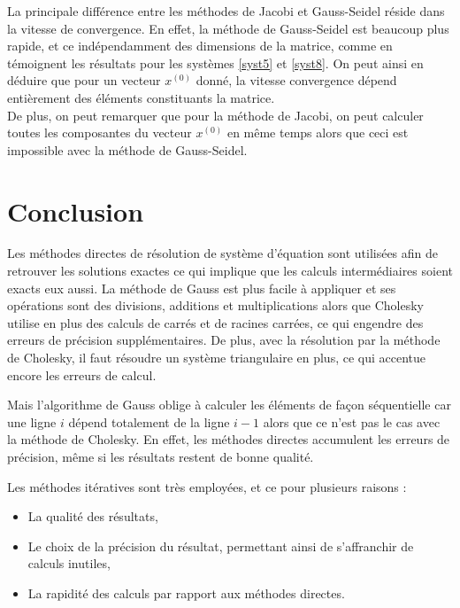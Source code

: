 \documentclass{report}
\begin{document}
        La principale différence entre les méthodes de Jacobi et Gauss-Seidel réside dans la vitesse de convergence. En effet, la méthode de Gauss-Seidel est beaucoup plus rapide, et ce indépendamment des dimensions de la matrice, comme en témoignent les résultats pour les systèmes \eqref{syst5} et \eqref{syst8}.
	On peut ainsi en déduire que pour un vecteur $x^{(0)}$ donné, la vitesse convergence dépend entièrement des éléments constituants la matrice. \\
	De plus, on peut remarquer que pour la méthode de Jacobi, on peut calculer toutes les composantes du  vecteur $x^{(0)}$ en même temps alors que ceci est impossible avec la méthode de Gauss-Seidel.
        
        
  \chapter{Conclusion}
  	Les méthodes directes de résolution de système d'équation sont utilisées afin de retrouver les solutions exactes ce qui implique que les calculs intermédiaires soient exacts eux aussi.
    \vspace{0.3cm}
    La méthode de Gauss est plus facile à appliquer et ses opérations sont des divisions, additions et multiplications alors que Cholesky utilise en plus des calculs de carrés et de racines carrées, ce qui engendre des erreurs de précision supplémentaires. De plus, avec la résolution par la méthode de Cholesky, il faut résoudre un système triangulaire en plus, ce qui accentue encore les erreurs de calcul.
    
    Mais l'algorithme de Gauss oblige à calculer les éléments de façon séquentielle car une ligne $i$ dépend totalement de la ligne $i-1$ alors que ce n'est pas le cas avec la méthode de Cholesky.
    En effet, les méthodes directes accumulent les erreurs de précision, même si les résultats restent de bonne qualité.

    \vspace{0.3cm}
    Les méthodes itératives sont très employées, et ce pour plusieurs raisons :
        \begin{itemize}
          \item{La qualité des résultats,}
          \item{Le choix de la précision du résultat, permettant ainsi de s'affranchir de calculs inutiles,}
          \item{La rapidité des calculs par rapport aux méthodes directes.}
        \end{itemize}
    \vspace{0.3cm}
\end{document}
